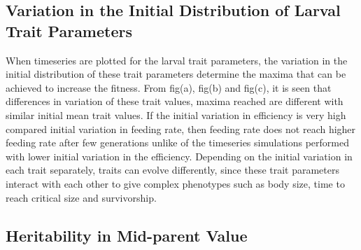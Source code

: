 \subsection{Variation in the Initial Distribution of Larval Trait Parameters}
When timeseries are plotted for the larval trait parameters, the variation in the initial distribution of these trait parameters determine the maxima that can be achieved to increase the fitness. From fig(a), fig(b) and fig(c), it is seen that differences in variation of these trait values, maxima reached are different with similar initial mean trait values. If the initial variation in efficiency is very high compared initial variation in feeding rate, then feeding rate does not reach higher feeding rate after few generations unlike of the timeseries simulations performed with lower initial variation in the efficiency. Depending on the initial variation in each trait separately, traits can evolve differently, since these trait parameters interact with each other to give complex phenotypes such as body size, time to reach critical size and survivorship.
\subsection{Heritability in Mid-parent Value}

\pagebreak
